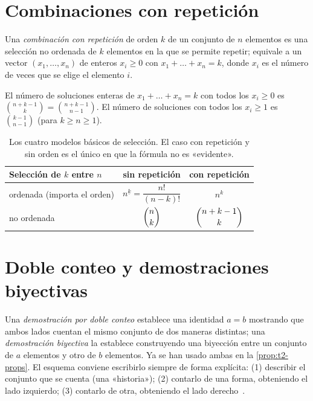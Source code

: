 \section{Combinaciones con repetición}

\begin{definicion}
Una \emph{combinación con repetición} de orden $k$ de un conjunto de $n$ elementos es una selección no ordenada de $k$ elementos en la que se permite repetir; equivale a un vector $(x_1,\dots,x_n)$ de enteros $x_i\ge 0$ con $x_1+\dots+x_n=k$, donde $x_i$ es el número de veces que se elige el elemento $i$.
\end{definicion}

\begin{teorema}\label{teo:t2-estrellas}
El número de soluciones enteras de $x_1+\dots+x_n=k$ con todos los $x_i\ge0$ es $\binom{n+k-1}{k}=\binom{n+k-1}{n-1}$. El número de soluciones con todos los $x_i\ge1$ es $\binom{k-1}{n-1}$ (para $k\ge n\ge 1$).
\end{teorema}

\begin{table}[h]
\centering
\begin{tabular}{@{}lcc@{}}
\toprule
Selección de $k$ entre $n$ & sin repetición & con repetición \\
\midrule
ordenada (importa el orden) & $n^{\underline{k}}=\dfrac{n!}{(n-k)!}$ & $n^{k}$ \\[8pt]
no ordenada & $\dbinom{n}{k}$ & $\dbinom{n+k-1}{k}$ \\
\bottomrule
\end{tabular}
\caption{Los cuatro modelos básicos de selección. El caso con repetición y sin orden es el único en que la fórmula no es «evidente».}
\label{tab:t2-modelos}
\end{table}

\section{Doble conteo y demostraciones biyectivas}

Una \emph{demostración por doble conteo} establece una identidad $a=b$ mostrando que ambos lados cuentan el mismo conjunto de dos maneras distintas; una \emph{demostración biyectiva} la establece construyendo una biyección entre un conjunto de $a$ elementos y otro de $b$ elementos. Ya se han usado ambas en la \cref{prop:t2-props}. El esquema conviene escribirlo siempre de forma explícita: (1) describir el conjunto que se cuenta (una «historia»); (2) contarlo de una forma, obteniendo el lado izquierdo; (3) contarlo de otra, obteniendo el lado derecho~\cite[§1.5]{bh}.

